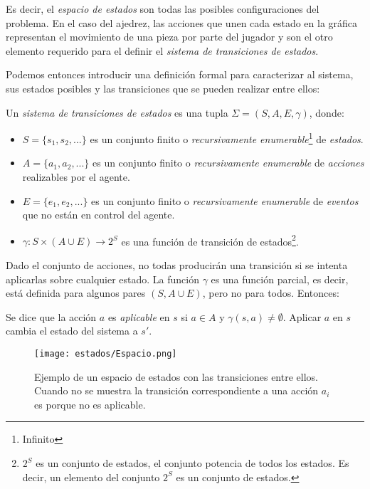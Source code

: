 Es decir, el \emph{espacio de estados} son todas las posibles configuraciones del problema. En el caso del ajedrez, las acciones que unen cada estado en la gráfica representan el movimiento de una pieza por parte del jugador y son el otro elemento requerido para el definir el \emph{sistema de transiciones de estados}.

Podemos entonces introducir una definición formal para caracterizar al sistema, sus estados posibles y las transiciones que se pueden realizar entre ellos:


\begin{definition}
 Un \emph{sistema de transiciones de estados} es una tupla $\Sigma=(S,A,E, \gamma)$, donde:
 \begin{itemize}
  \item $S= \{s_1,s_2,...\}$ es un conjunto finito o \textit{recursivamente enumerable}\footnote{Infinito} de \emph{estados}.
  \item $A= \{a_1,a_2,...\}$ es un conjunto finito o \textit{recursivamente enumerable} de \emph{acciones} realizables por el agente.
  \item $E= \{e_1,e_2,...\}$ es un conjunto finito o \textit{recursivamente enumerable} de \emph{eventos} que no están en control del agente.
  \item $\gamma: S \times (A \cup E) \rightarrow 2^S$ es una función de transición de estados\footnote{$2^S$ es un conjunto de estados, el conjunto potencia de todos los estados.  Es decir, un elemento del conjunto $2^S$ es un conjunto de estados.}.
 \end{itemize}
 \parencite{Ghallab2004}
\end{definition}

Dado el conjunto de acciones, no todas producirán una transición si se intenta aplicarlas sobre cualquier estado.  La función $\gamma$ es una función parcial, es decir, está definida para algunos pares $(S, A \cup E)$, pero no para todos.  Entonces:

\begin{definition}
  Se dice que la acción $a$ es \emph{aplicable} en $s$ si $a \in A$ y $\gamma(s,a) \neq \emptyset$.  Aplicar $a$ en $s$ cambia el estado del sistema a $s'$. \parencite{Ghallab2004}
\end{definition}

\begin{figure}
  \centering
  \texttt{[image: estados/Espacio.png]}
  \caption{Ejemplo de un espacio de estados con las transiciones entre ellos. Cuando no se muestra la transición correspondiente a una acción $a_i$ es porque no es aplicable.}
  \label{fig:espacioestados}
\end{figure}


